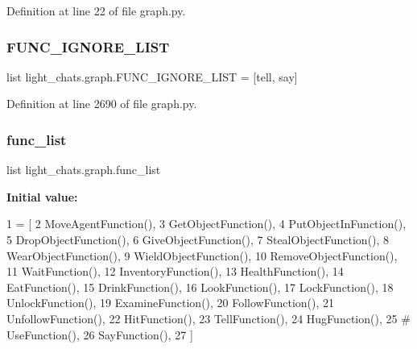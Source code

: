 Definition at line 22 of file graph.\+py.

\mbox{\label{namespacelight__chats_1_1graph_aa2daac624f9a87ba88bfdae4480a3e93}} 
\subsubsection{\texorpdfstring{F\+U\+N\+C\+\_\+\+I\+G\+N\+O\+R\+E\+\_\+\+L\+I\+ST}{FUNC\_IGNORE\_LIST}}
{\footnotesize\ttfamily list light\+\_\+chats.\+graph.\+F\+U\+N\+C\+\_\+\+I\+G\+N\+O\+R\+E\+\_\+\+L\+I\+ST = \mbox{[}\textquotesingle{}tell\textquotesingle{}, \textquotesingle{}say\textquotesingle{}\mbox{]}}



Definition at line 2690 of file graph.\+py.

\mbox{\label{namespacelight__chats_1_1graph_ac24f4da0b1507f9a09817c9ccf2f8058}} 
\subsubsection{\texorpdfstring{func\+\_\+list}{func\_list}}
{\footnotesize\ttfamily list light\+\_\+chats.\+graph.\+func\+\_\+list}

{\bfseries Initial value\+:}
\begin{DoxyCode}
1 =  [
2     MoveAgentFunction(),
3     GetObjectFunction(),
4     PutObjectInFunction(),
5     DropObjectFunction(),
6     GiveObjectFunction(),
7     StealObjectFunction(),
8     WearObjectFunction(),
9     WieldObjectFunction(),
10     RemoveObjectFunction(),
11     WaitFunction(),
12     InventoryFunction(),
13     HealthFunction(),
14     EatFunction(),
15     DrinkFunction(),
16     LookFunction(),
17     LockFunction(),
18     UnlockFunction(),
19     ExamineFunction(),
20     FollowFunction(),
21     UnfollowFunction(),
22     HitFunction(),
23     TellFunction(),
24     HugFunction(),
25     \textcolor{comment}{# UseFunction(),}
26     SayFunction(),
27 ]
\end{DoxyCode}


